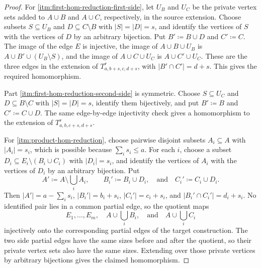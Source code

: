 \documentclass[10pt,a4paper]{article}
\theoremstyle{plain}
\theoremstyle{definition}
\theoremstyle{plain}
\begin{document}
\begin{proof}
For \ref{itm:first-hom-reduction-first-side}, let $U_B$ and $U_C$ be the private vertex sets added to $A\cup B$ and $A\cup C$, respectively, in the source extension.  Choose subsets $S\subseteq U_B$ and $D\subseteq C\setminus B$ with $|S|=|D|=s$, and identify the vertices of $S$ with the vertices of $D$ by an arbitrary bijection.  Put $B'\coloneqq B\cup D$ and $C'\coloneqq C$.  The image of the edge $E$ is injective, the image of $A\cup B\cup U_B$ is $A\cup B'\cup(U_B\setminus S)$, and the image of $A\cup C\cup U_C$ is $A\cup C'\cup U_C$.  These are the three edges in the extension of $T^r_{a,b+s,c,d+s}$, with $|B'\cap C'|=d+s$.  This gives the required homomorphism.

Part \ref{itm:first-hom-reduction-second-side} is symmetric.  Choose $S\subseteq U_C$ and $D\subseteq B\setminus C$ with $|S|=|D|=s$, identify them bijectively, and put $B'\coloneqq B$ and $C'\coloneqq C\cup D$.  The same edge-by-edge injectivity check gives a homomorphism to the extension of $T^r_{a,b,c+s,d+s}$.

For \ref{itm:product-hom-reduction}, choose pairwise disjoint subsets $A_i\subseteq A$ with $|A_i|=s_i$, which is possible because $\sum_i s_i\le a$.  For each $i$, choose a subset $D_i\subseteq E_i\setminus(B_i\cup C_i)$ with $|D_i|=s_i$, and identify the vertices of $A_i$ with the vertices of $D_i$ by an arbitrary bijection.  Put
\[
        A'\coloneqq A\setminus\bigcup_i A_i,\qquad
        B_i'\coloneqq B_i\cup D_i,\quad\text{and}\quad
        C_i'\coloneqq C_i\cup D_i.
\]
Then $|A'|=a-\sum_i s_i$, $|B_i'|=b_i+s_i$, $|C_i'|=c_i+s_i$, and $|B_i'\cap C_i'|=d_i+s_i$.  No identified pair lies in a common partial edge, so the quotient maps
\[
        E_1,\ldots,E_m,\quad
        A\cup\bigcup_i B_i,\quad\text{and}\quad
        A\cup\bigcup_i C_i
\]
injectively onto the corresponding partial edges of the target construction.  The two side partial edges have the same sizes before and after the quotient, so their private vertex sets also have the same sizes.  Extending over those private vertices by arbitrary bijections gives the claimed homomorphism.
\end{proof}
\end{document}
